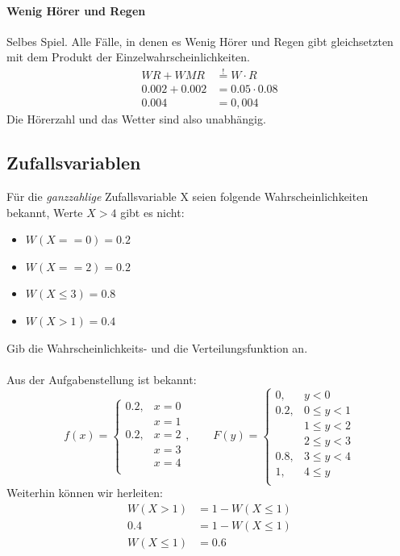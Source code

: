 \documentclass[11pt, a4paper]{article}
\begin{document}
\paragraph{Wenig Hörer und Regen} Selbes Spiel. Alle Fälle, in denen es Wenig Hörer und Regen gibt gleichsetzten mit dem Produkt der Einzelwahrscheinlichkeiten.
\begin{align*}
	WR + WMR &\overset{!}{=} W \cdot R \\
	0.002 + 0.002 &= 0.05 \cdot 0.08 \\
	0.004 &= 0,004
\end{align*}
Die Hörerzahl und das Wetter sind also unabhängig.

\subsection{Zufallsvariablen}
Für die \emph{ganzzahlige} Zufallsvariable X seien folgende Wahrscheinlichkeiten bekannt, Werte $X > 4$ gibt es nicht:
\begin{itemize}
	\item $W(X == 0) = 0.2$
	\item $W(X == 2) = 0.2$
	\item $W(X \leq 3) = 0.8$
	\item $W(X > 1) = 0.4$
\end{itemize}
Gib die Wahrscheinlichkeits- und die Verteilungsfunktion an.\\
\\
Aus der Aufgabenstellung ist bekannt:
\[
f(x) = 
\begin{cases}
	0.2, & x = 0 \\
	& x = 1 \\
	0.2, & x = 2 \\
	& x = 3 \\
	& x = 4 \\
\end{cases}, \qquad
F(y) =
\begin{cases}
	0, & y < 0 \\
	0.2, & 0 \leq y < 1 \\
	& 1 \leq y < 2 \\
	& 2 \leq y < 3 \\
	0.8, & 3 \leq y < 4 \\
	1, & 4 \leq y \\
\end{cases}
\]
Weiterhin können wir herleiten:
\begin{align*}
	W(X > 1) &= 1 - W(X \leq 1) \\
	0.4 &= 1 - W(X \leq 1) \\
	W(X \leq 1) &= 0.6
\end{align*}
\end{document}
